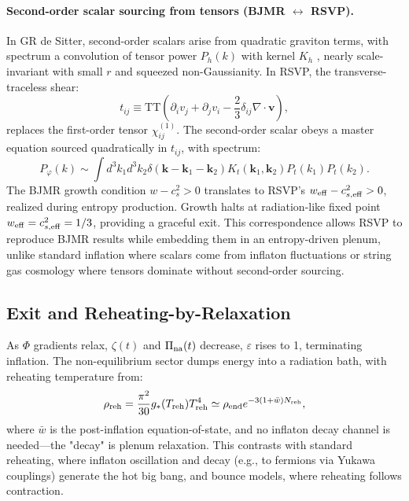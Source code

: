 \documentclass[12pt, a4paper, openany]{book}
\theoremstyle{definition}
\begin{document}
\paragraph{Second-order scalar sourcing from tensors (BJMR $\leftrightarrow$ RSVP).}
In GR de Sitter, second-order scalars arise from quadratic graviton terms, with spectrum a convolution of tensor power $P_h(k)$ with kernel $K_h$ \citep{Bertacca2024}, nearly scale-invariant with small $r$ and squeezed non-Gaussianity. In RSVP, the transverse-traceless shear:
\begin{equation}
t_{ij} \equiv \mathrm{TT}\left(\partial_i v_j + \partial_j v_i - \frac{2}{3} \delta_{ij} \nabla \cdot \mathbf{v}\right),
\end{equation}
replaces the first-order tensor $\chi_{ij}^{(1)}$. The second-order scalar obeys a master equation sourced quadratically in $t_{ij}$, with spectrum:
\begin{equation}
P_\varphi(k) \sim \int d^3 k_1 d^3 k_2 \delta(\mathbf{k} - \mathbf{k}_1 - \mathbf{k}_2) K_t(\mathbf{k}_1, \mathbf{k}_2) P_t(k_1) P_t(k_2).
\end{equation}
The BJMR growth condition $w - c_s^2 > 0$ translates to RSVP's $w_{\rm eff} - c_{s,\rm eff}^2 > 0$, realized during entropy production. Growth halts at radiation-like fixed point $w_{\rm eff} = c_{s,\rm eff}^2 = 1/3$, providing a graceful exit. This correspondence allows RSVP to reproduce BJMR results while embedding them in an entropy-driven plenum, unlike standard inflation where scalars come from inflaton fluctuations or string gas cosmology where tensors dominate without second-order sourcing.

\subsection{Exit and Reheating-by-Relaxation}
As $\Phi$ gradients relax, $\zeta(t)$ and $\Pi_{\rm na}(t)$ decrease, $\varepsilon$ rises to 1, terminating inflation. The non-equilibrium sector dumps energy into a radiation bath, with reheating temperature from:
\begin{equation}
\rho_{\rm reh} = \frac{\pi^2}{30} g_*(T_{\rm reh}) T_{\rm reh}^4 \simeq \rho_{\rm end} e^{-3(1 + \bar{w}) N_{\rm reh}},
\end{equation}
where $\bar{w}$ is the post-inflation equation-of-state, and no inflaton decay channel is needed—the "decay" is plenum relaxation. This contrasts with standard reheating, where inflaton oscillation and decay (e.g., to fermions via Yukawa couplings) generate the hot big bang, and bounce models, where reheating follows contraction.
\end{document}
